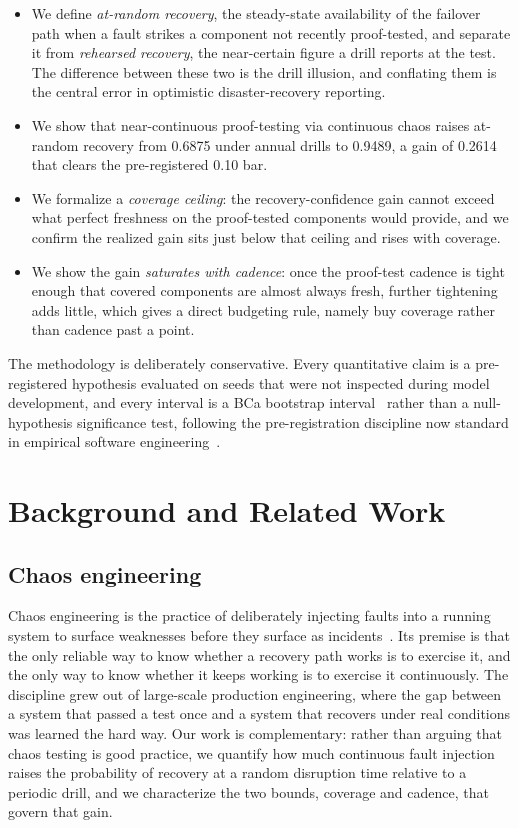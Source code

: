 \documentclass[journal]{IEEEtran}
\begin{document}
\begin{itemize}
\item We define \emph{at-random recovery}, the steady-state availability of the failover path when a
fault strikes a component not recently proof-tested, and separate it from \emph{rehearsed recovery},
the near-certain figure a drill reports at the test. The difference between these two is the drill
illusion, and conflating them is the central error in optimistic disaster-recovery reporting.
\item We show that near-continuous proof-testing via continuous chaos raises at-random recovery from
0.6875 under annual drills to 0.9489, a gain of 0.2614 that clears the pre-registered 0.10 bar.
\item We formalize a \emph{coverage ceiling}: the recovery-confidence gain cannot exceed what
perfect freshness on the proof-tested components would provide, and we confirm the realized gain sits
just below that ceiling and rises with coverage.
\item We show the gain \emph{saturates with cadence}: once the proof-test cadence is tight enough
that covered components are almost always fresh, further tightening adds little, which gives a direct
budgeting rule, namely buy coverage rather than cadence past a point.
\end{itemize}

The methodology is deliberately conservative. Every quantitative claim is a pre-registered
hypothesis evaluated on seeds that were not inspected during model development, and every interval
is a BCa bootstrap interval~\cite{efron1987bca,efron1994introduction} rather than a null-hypothesis
significance test, following the pre-registration discipline now standard in empirical software
engineering~\cite{wohlin2012experimentation}.

\section{Background and Related Work}

\subsection{Chaos engineering}
Chaos engineering is the practice of deliberately injecting faults into a running system to surface
weaknesses before they surface as incidents~\cite{basiri2016chaos}. Its premise is that the only
reliable way to know whether a recovery path works is to exercise it, and the only way to know
whether it keeps working is to exercise it continuously. The discipline grew out of large-scale
production engineering, where the gap between a system that passed a test once and a system that
recovers under real conditions was learned the hard way. Our work is complementary: rather than
arguing that chaos testing is good practice, we quantify how much continuous fault injection raises
the probability of recovery at a random disruption time relative to a periodic drill, and we
characterize the two bounds, coverage and cadence, that govern that gain.
\end{document}
